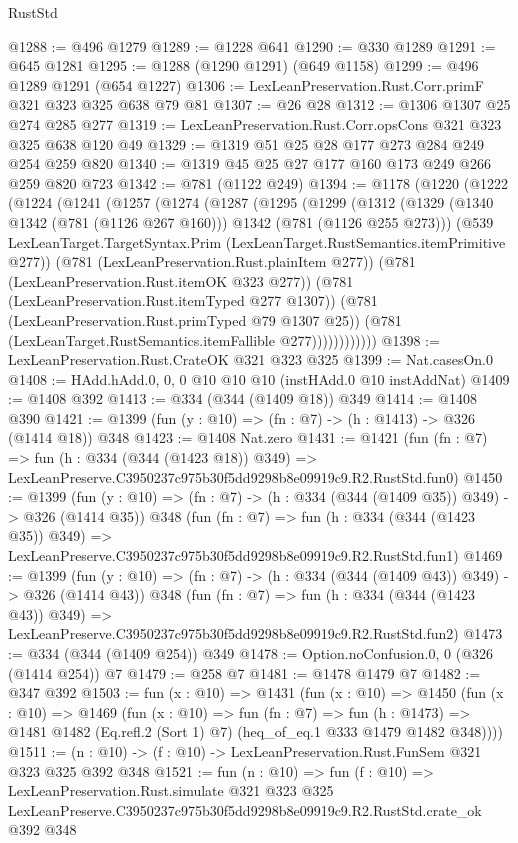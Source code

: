\begin{lexlean}{RustStd}
\begin{coremodule}
@1288 := @496 @1279
@1289 := @1228 @641
@1290 := @330 @1289
@1291 := @645 @1281
@1295 := @1288 (@1290 @1291) (@649 @1158)
@1299 := @496 @1289 @1291 (@654 @1227)
@1306 := LexLeanPreservation.Rust.Corr.primF @321 @323 @325 @638 @79 @81
@1307 := @26 @28
@1312 := @1306 @1307 @25 @274 @285 @277
@1319 := LexLeanPreservation.Rust.Corr.opsCons @321 @323 @325 @638 @120 @49
@1329 := @1319 @51 @25 @28 @177 @273 @284 @249 @254 @259 @820
@1340 := @1319 @45 @25 @27 @177 @160 @173 @249 @266 @259 @820 @723
@1342 := @781 (@1122 @249)
@1394 := @1178
    (@1220
      (@1222
        (@1224
          (@1241
            (@1257
              (@1274
                (@1287
                  (@1295
                    (@1299
                      (@1312
                        (@1329
                          (@1340 @1342 (@781 (@1126 @267 @160)))
                          @1342
                          (@781 (@1126 @255 @273)))
                        (@539
                          LexLeanTarget.TargetSyntax.Prim
                          (LexLeanTarget.RustSemantics.itemPrimitive @277))
                        (@781 (LexLeanPreservation.Rust.plainItem @277))
                        (@781 (LexLeanPreservation.Rust.itemOK @323 @277))
                        (@781 (LexLeanPreservation.Rust.itemTyped @277 @1307))
                        (@781 (LexLeanPreservation.Rust.primTyped @79 @1307 @25))
                        (@781 (LexLeanTarget.RustSemantics.itemFallible @277))))))))))))
@1398 := LexLeanPreservation.Rust.CrateOK @321 @323 @325
@1399 := Nat.casesOn.{0}
@1408 := HAdd.hAdd.{0, 0, 0} @10 @10 @10 (instHAdd.{0} @10 instAddNat)
@1409 := @1408 @392
@1413 := @334 (@344 (@1409 @18)) @349
@1414 := @1408 @390
@1421 := @1399 (fun (y : @10) => (fn : @7) -> (h : @1413) -> @326 (@1414 @18)) @348
@1423 := @1408 Nat.zero
@1431 := @1421
    (fun (fn : @7) =>
    fun (h : @334 (@344 (@1423 @18)) @349) =>
    LexLeanPreserve.C3950237c975b30f5dd9298b8e09919c9.R2.RustStd.fun0)
@1450 := @1399
    (fun (y : @10) => (fn : @7) -> (h : @334 (@344 (@1409 @35)) @349) -> @326 (@1414 @35))
    @348
    (fun (fn : @7) =>
    fun (h : @334 (@344 (@1423 @35)) @349) =>
    LexLeanPreserve.C3950237c975b30f5dd9298b8e09919c9.R2.RustStd.fun1)
@1469 := @1399
    (fun (y : @10) => (fn : @7) -> (h : @334 (@344 (@1409 @43)) @349) -> @326 (@1414 @43))
    @348
    (fun (fn : @7) =>
    fun (h : @334 (@344 (@1423 @43)) @349) =>
    LexLeanPreserve.C3950237c975b30f5dd9298b8e09919c9.R2.RustStd.fun2)
@1473 := @334 (@344 (@1409 @254)) @349
@1478 := Option.noConfusion.{0, 0} (@326 (@1414 @254)) @7
@1479 := @258 @7
@1481 := @1478 @1479 @7
@1482 := @347 @392
@1503 := fun (x : @10) =>
  @1431
    (fun (x : @10) =>
    @1450
      (fun (x : @10) =>
      @1469
        (fun (x : @10) =>
        fun (fn : @7) =>
        fun (h : @1473) =>
        @1481 @1482 (Eq.refl.{2} (Sort 1) @7) (heq_of_eq.{1} @333 @1479 @1482 @348))))
@1511 := (n : @10) -> (f : @10) -> LexLeanPreservation.Rust.FunSem @321 @323 @325 @392 @348
@1521 := fun (n : @10) =>
  fun (f : @10) =>
  LexLeanPreservation.Rust.simulate
    @321
    @323
    @325
    LexLeanPreserve.C3950237c975b30f5dd9298b8e09919c9.R2.RustStd.crate_ok
    @392
    @348
\end{coremodule}
\end{lexlean}
